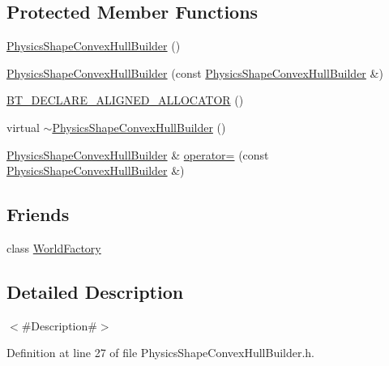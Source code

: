 \subsection*{Protected Member Functions}
\begin{DoxyCompactItemize}
\item 
\mbox{\hyperlink{classnjli_1_1_physics_shape_convex_hull_builder_a9119532f39d13cf420723d9e6312a8ff}{Physics\+Shape\+Convex\+Hull\+Builder}} ()
\item 
\mbox{\hyperlink{classnjli_1_1_physics_shape_convex_hull_builder_aa754e19f449577cb65927645cc4fedac}{Physics\+Shape\+Convex\+Hull\+Builder}} (const \mbox{\hyperlink{classnjli_1_1_physics_shape_convex_hull_builder}{Physics\+Shape\+Convex\+Hull\+Builder}} \&)
\item 
\mbox{\hyperlink{classnjli_1_1_physics_shape_convex_hull_builder_acf566e62ddaef7659b11a27e273b8858}{B\+T\+\_\+\+D\+E\+C\+L\+A\+R\+E\+\_\+\+A\+L\+I\+G\+N\+E\+D\+\_\+\+A\+L\+L\+O\+C\+A\+T\+OR}} ()
\item 
virtual \mbox{\hyperlink{classnjli_1_1_physics_shape_convex_hull_builder_a67c4e81cf3a30215cdcf9af6304e9c4c}{$\sim$\+Physics\+Shape\+Convex\+Hull\+Builder}} ()
\item 
\mbox{\hyperlink{classnjli_1_1_physics_shape_convex_hull_builder}{Physics\+Shape\+Convex\+Hull\+Builder}} \& \mbox{\hyperlink{classnjli_1_1_physics_shape_convex_hull_builder_ad9318041e15c04f4ecb9f6dbb35935cd}{operator=}} (const \mbox{\hyperlink{classnjli_1_1_physics_shape_convex_hull_builder}{Physics\+Shape\+Convex\+Hull\+Builder}} \&)
\end{DoxyCompactItemize}
\subsection*{Friends}
\begin{DoxyCompactItemize}
\item 
class \mbox{\hyperlink{classnjli_1_1_physics_shape_convex_hull_builder_acb96ebb09abe8f2a37a915a842babfac}{World\+Factory}}
\end{DoxyCompactItemize}


\subsection{Detailed Description}
$<$\#\+Description\#$>$ 

Definition at line 27 of file Physics\+Shape\+Convex\+Hull\+Builder.\+h.



